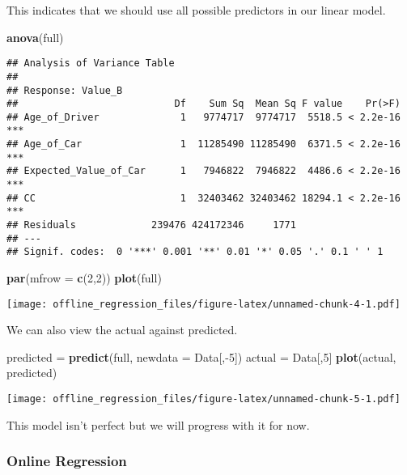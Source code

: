 \documentclass[]{article}
\newenvironment{Shaded}{\begin{snugshade}}{\end{snugshade}}
\newcommand{\KeywordTok}[1]{\textcolor[rgb]{0.13,0.29,0.53}{\textbf{{#1}}}}
\newcommand{\DataTypeTok}[1]{\textcolor[rgb]{0.13,0.29,0.53}{{#1}}}
\newcommand{\DecValTok}[1]{\textcolor[rgb]{0.00,0.00,0.81}{{#1}}}
\newcommand{\StringTok}[1]{\textcolor[rgb]{0.31,0.60,0.02}{{#1}}}
\newcommand{\NormalTok}[1]{{#1}}
\begin{document}
This indicates that we should use all possible predictors in our linear
model.

\begin{Shaded}
\begin{Highlighting}[]
\KeywordTok{anova}\NormalTok{(full)}
\end{Highlighting}
\end{Shaded}

\begin{verbatim}
## Analysis of Variance Table
## 
## Response: Value_B
##                           Df    Sum Sq  Mean Sq F value    Pr(>F)    
## Age_of_Driver              1   9774717  9774717  5518.5 < 2.2e-16 ***
## Age_of_Car                 1  11285490 11285490  6371.5 < 2.2e-16 ***
## Expected_Value_of_Car      1   7946822  7946822  4486.6 < 2.2e-16 ***
## CC                         1  32403462 32403462 18294.1 < 2.2e-16 ***
## Residuals             239476 424172346     1771                      
## ---
## Signif. codes:  0 '***' 0.001 '**' 0.01 '*' 0.05 '.' 0.1 ' ' 1
\end{verbatim}

\begin{Shaded}
\begin{Highlighting}[]
\KeywordTok{par}\NormalTok{(}\DataTypeTok{mfrow =} \KeywordTok{c}\NormalTok{(}\DecValTok{2}\NormalTok{,}\DecValTok{2}\NormalTok{))}
\KeywordTok{plot}\NormalTok{(full)}
\end{Highlighting}
\end{Shaded}

\texttt{[image: offline\_regression\_files/figure-latex/unnamed-chunk-4-1.pdf]}

We can also view the actual against predicted.

\begin{Shaded}
\begin{Highlighting}[]
\NormalTok{predicted =}\StringTok{ }\KeywordTok{predict}\NormalTok{(full, }\DataTypeTok{newdata =} \NormalTok{Data[,-}\DecValTok{5}\NormalTok{])}
\NormalTok{actual =}\StringTok{ }\NormalTok{Data[,}\DecValTok{5}\NormalTok{]}
\KeywordTok{plot}\NormalTok{(actual, predicted)}
\end{Highlighting}
\end{Shaded}

\texttt{[image: offline\_regression\_files/figure-latex/unnamed-chunk-5-1.pdf]}

This model isn't perfect but we will progress with it for now.

\subsubsection{Online Regression}\label{online-regression}
\end{document}
